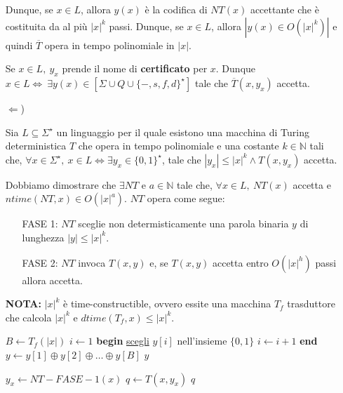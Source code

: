 \begin{itemize}
{        Dunque, se $x \in L$, allora $y(x)$ è la codifica di $NT(x)$ accettante che è costituita da al più $|x|^k$ passi. 
        Dunque, se $x \in L$, allora $|y(x) \in O(|x|^k)|$ e quindi $\overline{T}$ opera in tempo polinomiale in $|x|$.

        Se $x \in L,\ y_{x}$ prende il nome di \textbf{certificato} per $x$. Dunque $x \in L \Leftrightarrow\ \exists y(x) \in [\Sigma \cup Q \cup \{-, s, f, d\}^{\star}]$ tale che $\overline{T}(x, y_{x})$ accetta.
    }
    \item [$\Leftarrow$)]{
        Sia $L \subseteq \Sigma^{\star}$ un linguaggio per il quale esistono una macchina di Turing deterministica $T$ che opera in 
        tempo polinomiale e una costante $k \in \mathbb{N}$ tali che, $\forall x \in \Sigma^{\star},\ x \in L \Leftrightarrow \exists y_{x} \in \{0, 1\}^{\star}$, tale che $|y_{x}| \leq |x|^k \land T(x, y_{x})$ accetta.

        Dobbiamo dimostrare che $\exists NT$ e $a \in \mathbb{N}$ tale che, $\forall x \in L,\ NT(x)$ accetta e $ntime(NT, x) \in O(|x|^a)$. $NT$ opera come segue:
        \begin{itemize}
            \item [FASE 1: ] $NT$ sceglie non determisticamente una parola binaria $y$ di lunghezza $|y| \leq |x|^k$.
            \item [FASE 2: ] $NT$ invoca $T(x, y)$ e, se $T(x, y)$ accetta entro $O(|x|^h)$ passi allora accetta.
        \end{itemize}

        \textbf{NOTA:} $|x|^k$ è time-constructible, ovvero essite una macchina $T_{f}$ trasduttore che calcola $|x|^k$ e $dtime(T_{f}, x) \leq |x|^k$.
    
        \begin{algorithm}[ht]
            \begin{algorithmic}[1]
                    \State $B \gets T_{f}(|x|)$
                    \State $i \gets 1$
                     \textbf{begin}
                        \State \underline{scegli} $y[i]$ nell'insieme $\{0, 1\}$
                        \State $i \gets i + 1$
                    \EndWhile \textbf{end}
                    \State $y \gets y[1] \oplus y[2] \oplus \dots \oplus y[B]$
                    \State \Return $y$
                \EndProcedure

                    \State $y_{x} \gets NT-FASE-1(x)$ 
                    \State $q \gets T(x, y_{x})$ 
                    \State \Return $q$
                \EndProcedure
            \end{algorithmic}
        \end{algorithm}
        
}
\end{itemize}
